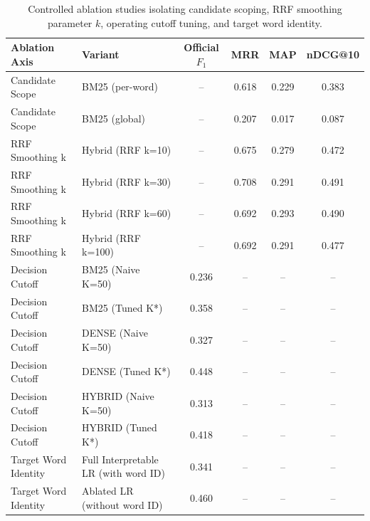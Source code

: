 \begin{table}[t]
\centering
\small
\begin{tabular}{llcccc}
\toprule
\textbf{Ablation Axis} & \textbf{Variant} & \textbf{Official $F_1$} & \textbf{MRR} & \textbf{MAP} & \textbf{nDCG@10} \\
\midrule
Candidate Scope & BM25 (per-word) & -- & 0.618 & 0.229 & 0.383 \\
Candidate Scope & BM25 (global) & -- & 0.207 & 0.017 & 0.087 \\
RRF Smoothing k & Hybrid (RRF k=10) & -- & 0.675 & 0.279 & 0.472 \\
RRF Smoothing k & Hybrid (RRF k=30) & -- & 0.708 & 0.291 & 0.491 \\
RRF Smoothing k & Hybrid (RRF k=60) & -- & 0.692 & 0.293 & 0.490 \\
RRF Smoothing k & Hybrid (RRF k=100) & -- & 0.692 & 0.291 & 0.477 \\
Decision Cutoff & BM25 (Naive K=50) & 0.236 & -- & -- & -- \\
Decision Cutoff & BM25 (Tuned K*) & 0.358 & -- & -- & -- \\
Decision Cutoff & DENSE (Naive K=50) & 0.327 & -- & -- & -- \\
Decision Cutoff & DENSE (Tuned K*) & 0.448 & -- & -- & -- \\
Decision Cutoff & HYBRID (Naive K=50) & 0.313 & -- & -- & -- \\
Decision Cutoff & HYBRID (Tuned K*) & 0.418 & -- & -- & -- \\
Target Word Identity & Full Interpretable LR (with word ID) & 0.341 & -- & -- & -- \\
Target Word Identity & Ablated LR (without word ID) & 0.460 & -- & -- & -- \\
\bottomrule
\end{tabular}
\caption{Controlled ablation studies isolating candidate scoping, RRF smoothing parameter $k$, operating cutoff tuning, and target word identity.}
\label{tab:ablation_summary}
\end{table}
